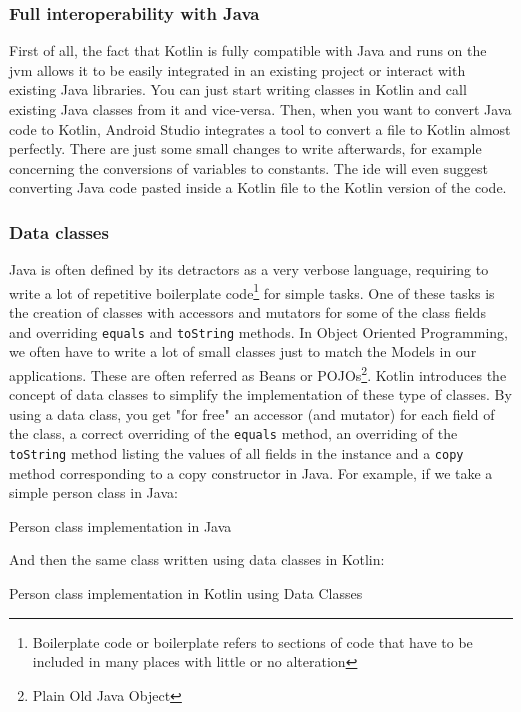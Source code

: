 \documentclass[twoside, openright,11pt,a4paper]{book}
\newenvironment{code}{\captionsetup{type=listing}}{}
\begin{document}
\subsubsection{Full interoperability with Java}
First of all, the fact that Kotlin is fully compatible with Java and runs on the \gls{jvm} allows it to be easily integrated in an existing project or interact with existing Java libraries. You can just start writing classes in Kotlin and call existing Java classes from it and vice-versa. Then, when you want to convert Java code to Kotlin, Android Studio integrates a tool to convert a file to Kotlin almost perfectly. There are just some small changes to write afterwards, for example concerning the conversions of variables to constants. The \gls{ide} will even suggest converting Java code pasted inside a Kotlin file to the Kotlin version of the code.
\subsubsection{Data classes}
Java is often defined by its detractors as a very verbose language, requiring to write a lot of repetitive boilerplate code\footnote{Boilerplate code or boilerplate refers to sections of code that have to be included in many places with little or no alteration\cite{wiki:define:boilerplate}} for simple tasks. One of these tasks is the creation of classes with accessors and mutators for some of the class fields and overriding \verb+equals+ and \verb+toString+ methods. In Object Oriented Programming, we often have to write a lot of small classes just to match the Models in our applications. These are often referred as Beans or POJOs\footnote{Plain Old Java Object}. Kotlin introduces the concept of data classes\cite{kotlin:doc:data_classes} to simplify the implementation of these type of classes. By using a data class, you get "for free" an accessor (and mutator) for each field of the class, a correct overriding of the \verb+equals+ method, an overriding of the \verb+toString+ method listing the values of all fields in the instance and a \verb+copy+ method corresponding to a copy constructor in Java. For example, if we take a simple person class in Java:
\begin{code}
\caption{Person class implementation in Java}	
\end{code}

And then the same class written using data classes in Kotlin:
\begin{code}
\caption{Person class implementation in Kotlin using Data Classes}	
\end{code}
\end{document}
